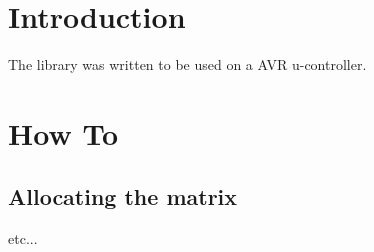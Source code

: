 \hypertarget{index_intro_sec}{}\section{Introduction}\label{index_intro_sec}
The library was written to be used on a A\+V\+R u-\/controller.\hypertarget{index_install_sec}{}\section{How To}\label{index_install_sec}
\hypertarget{index_allocation}{}\subsection{Allocating the matrix}\label{index_allocation}
etc... 